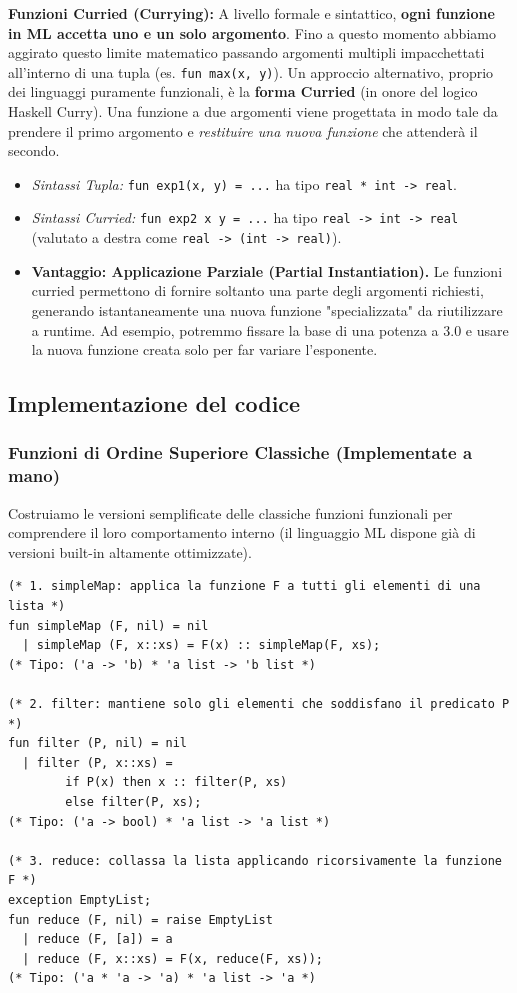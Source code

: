 \documentclass[12pt, a4paper]{article}
\begin{document}
\newpage

\textbf{Funzioni Curried (Currying):}
A livello formale e sintattico, \textbf{ogni funzione in ML accetta uno e un solo argomento}. Fino a questo momento abbiamo aggirato questo limite matematico passando argomenti multipli impacchettati all'interno di una tupla (es. \texttt{fun max(x, y)}).
Un approccio alternativo, proprio dei linguaggi puramente funzionali, è la \textbf{forma Curried} (in onore del logico Haskell Curry). Una funzione a due argomenti viene progettata in modo tale da prendere il primo argomento e \textit{restituire una nuova funzione} che attenderà il secondo.
\begin{itemize}
    \item \textit{Sintassi Tupla:} \texttt{fun exp1(x, y) = ...} ha tipo \texttt{real * int -> real}.
    \item \textit{Sintassi Curried:} \texttt{fun exp2 x y = ...} ha tipo \texttt{real -> int -> real} (valutato a destra come \texttt{real -> (int -> real)}).
    \item \textbf{Vantaggio: Applicazione Parziale (Partial Instantiation).} Le funzioni curried permettono di fornire soltanto una parte degli argomenti richiesti, generando istantaneamente una nuova funzione "specializzata" da riutilizzare a runtime. Ad esempio, potremmo fissare la base di una potenza a 3.0 e usare la nuova funzione creata solo per far variare l'esponente.
\end{itemize}

\subsection{Implementazione del codice}

\subsubsection{Funzioni di Ordine Superiore Classiche (Implementate a mano)}
Costruiamo le versioni semplificate delle classiche funzioni funzionali per comprendere il loro comportamento interno (il linguaggio ML dispone già di versioni built-in altamente ottimizzate).

\begin{verbatim}
(* 1. simpleMap: applica la funzione F a tutti gli elementi di una lista *)
fun simpleMap (F, nil) = nil
  | simpleMap (F, x::xs) = F(x) :: simpleMap(F, xs);
(* Tipo: ('a -> 'b) * 'a list -> 'b list *)

(* 2. filter: mantiene solo gli elementi che soddisfano il predicato P *)
fun filter (P, nil) = nil
  | filter (P, x::xs) = 
        if P(x) then x :: filter(P, xs) 
        else filter(P, xs);
(* Tipo: ('a -> bool) * 'a list -> 'a list *)

(* 3. reduce: collassa la lista applicando ricorsivamente la funzione F *)
exception EmptyList;
fun reduce (F, nil) = raise EmptyList
  | reduce (F, [a]) = a
  | reduce (F, x::xs) = F(x, reduce(F, xs));
(* Tipo: ('a * 'a -> 'a) * 'a list -> 'a *)
\end{verbatim}
\end{document}
